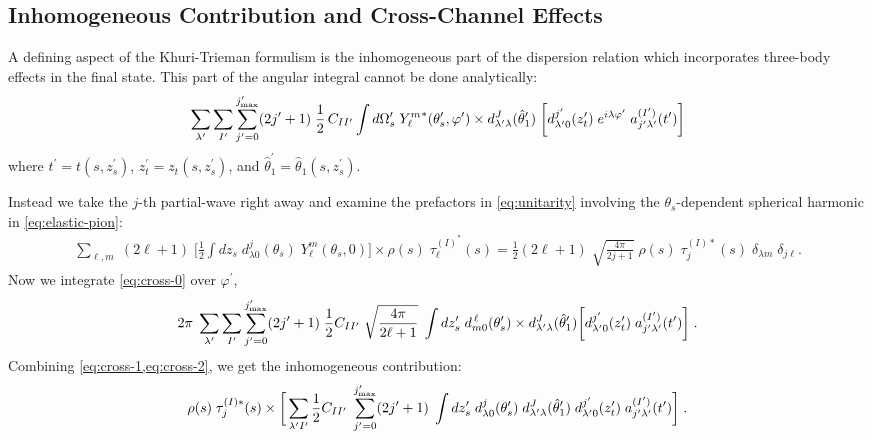 \subsection{Inhomogeneous Contribution and Cross-Channel Effects}
 A defining aspect of the Khuri-Trieman formulism is the inhomogeneous part of the dispersion relation which incorporates three-body effects in the final state. This part of the angular integral cannot be done analytically:
  \begin{align}
    \label{eq:cross-0}
   \sum_{\lambda^\prime} \sum_{I^\prime} \sum_{{j^\prime}=0}^{j^\prime_\text{max}} (2{j^\prime} + 1) \; \frac{1}{2} \, C_{II^\prime} \int d\Omega^\prime_s
    \; {Y^m_\ell}^*(\theta_s^\prime, \varphi^\prime)
    \times  d^J_{{\lambda^\prime} \lambda}(\hat{\theta}^\prime_1) \;
    \bigg[
     d_{{\lambda^\prime} 0}^{j^\prime}(z_t^\prime) \; e^{i\lambda \varphi^\prime} \; a^{({I^\prime})}_{{j^\prime} {\lambda^\prime}}(t^\prime)
    \bigg]
  \end{align}
where \(t^\prime = t(s,z_s^\prime)\), \(z_t^\prime = z_t(s,z_s^\prime)\), and \(\hat{\theta}_1^\prime = \hat{\theta}_1(s,z_s^\prime)\).

Instead we take the \(j\)-th partial-wave right away and examine the prefactors in \cref{eq:unitarity} involving the \(\theta_s\)-dependent spherical harmonic in \cref{eq:elastic-pion}:
  \begin{align}
    \label{eq:cross-1}
    \sum_{\ell, m} \; (2\ell +1) \;
      \bigg[ \frac{1}{2}
       \int dz_s \;
      d_{\lambda 0}^j(\theta_s) \; Y^m_\ell(\theta_s,0)
       \bigg]
        \times \rho(s) \; {\tau}^{(I)^*}_\ell(s)
  = \frac{1}{2} (2\ell +1) \; \sqrt{\frac{4\pi}{2j+1}} \; \rho(s) \; \tau_j^{(I)*}(s) \; \delta_{\lambda m} \; \delta_{j \ell}.
  \end{align}
Now we integrate \cref{eq:cross-0} over \(\varphi^\prime\),
  \begin{align}
    \label{eq:cross-2}
    2\pi \; \sum_{\lambda^\prime} \sum_{I^\prime} \sum_{{j^\prime}=0}^{j^\prime_\text{max}} (2{j^\prime} + 1) \; \frac{1}{2}C_{II^\prime} \; \sqrt{\frac{4\pi}{2\ell+1}} \;
     \int dz_s^\prime \; d_{m0}^{\,\ell}(\theta_s^\prime)
     \times
      d_{{\lambda^\prime} \lambda}^J(\hat{\theta}^\prime_1)
     \bigg[
      d_{{\lambda^\prime} 0}^{j^\prime}(z_t^\prime) \; a^{({I^\prime})}_{j^\prime{\lambda^\prime}}(t^\prime)
     \bigg] \; .
  \end{align}
Combining \cref{eq:cross-1,eq:cross-2}, we get the inhomogeneous contribution:
  \begin{align}
      \label{eq:pw-cross}
     \rho(s) \; \tau^{(I)*}_j(s) \times
     \bigg[
      \sum_{{\lambda^\prime} {I^\prime}} \frac{1}{2}C_{I{I^\prime}} \; \sum_{{j^\prime}=0}^{j^\prime_\text{max}} (2{j^\prime}+1) \;
      \int d z_s^\prime \; d_{\lambda0}^j(\theta^\prime_s) \;
      d_{{\lambda^\prime} \lambda}^J(\hat{\theta}^\prime_1) \; d_{{\lambda^\prime} 0}^{j^\prime}(z_t^\prime) \; a^{({I^\prime})}_{{j^\prime} {\lambda^\prime}}(t^\prime)
      \bigg] \; .
  \end{align}

